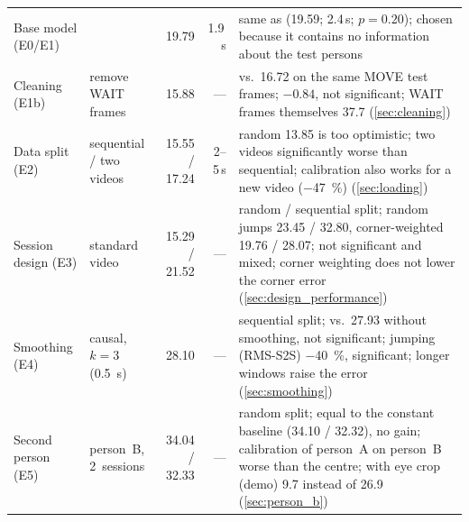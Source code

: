 \begin{table}[htbp]
\begin{tabularx}{\textwidth}{>{\raggedright\arraybackslash}p{2.3cm} >{\raggedright\arraybackslash}p{2.2cm} r r Y}
    Base model (E0/E1) &  & 19.79 & 1.9\,s & same as  (19.59; 2.4\,s; $p=0.20$); chosen because it contains no information about the test persons \\
    Cleaning (E1b) & remove WAIT frames & 15.88 & --- & vs.\ 16.72 on the same MOVE test frames; $-0.84$, not significant; WAIT frames themselves 37.7 (\cref{sec:cleaning}) \\
    Data split (E2) & sequential / two videos & 15.55 / 17.24 & 2--5\,s & random 13.85 is too optimistic; two videos significantly worse than sequential; calibration also works for a new video ($-$\SI{47}{\percent}) (\cref{sec:loading}) \\
    Session design (E3) & standard video & 15.29 / 21.52 & --- & random / sequential split; random jumps 23.45 / 32.80, corner-weighted 19.76 / 28.07; not significant and mixed; corner weighting does not lower the corner error (\cref{sec:design_performance}) \\
    Smoothing (E4) & causal, $k=3$ (\SI{0.5}{\second}) & 28.10 & --- & sequential split; vs.\ 27.93 without smoothing, not significant; jumping (RMS-S2S) $-$\SI{40}{\percent}, significant; longer windows raise the error (\cref{sec:smoothing}) \\
    Second person (E5) & person~B, 2~sessions & 34.04 / 32.33 & --- & random split; equal to the constant baseline (34.10 / 32.32), no gain; calibration of person~A on person~B worse than the centre; with eye crop (demo) 9.7 instead of 26.9 (\cref{sec:person_b}) \\
    \bottomrule
  \end{tabularx}
\end{table}
